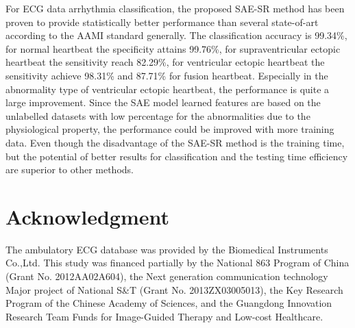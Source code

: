 \documentclass[journal]{IEEEtran}
\begin{document}
For ECG data arrhythmia classification, the proposed SAE-SR method has been proven to provide statistically better performance than several state-of-art according to the AAMI standard generally. The classification accuracy is 99.34\%, for normal heartbeat the specificity attains 99.76\%, for supraventricular ectopic heartbeat the sensitivity reach 82.29\%, for ventricular ectopic heartbeat the sensitivity achieve 98.31\% and 87.71\% for fusion heartbeat. Especially in the abnormality type of ventricular ectopic heartbeat, the performance is quite a large improvement. Since the SAE model learned features are based on the unlabelled datasets with low percentage for the abnormalities due to the physiological property, the performance could be improved with more training data. Even though the disadvantage of the SAE-SR method is the training time, but the potential of better results for classification and the testing time efficiency are superior to other methods. 


\section*{Acknowledgment}
The ambulatory ECG database was provided by the Biomedical Instruments Co.,Ltd.
This study was financed partially by the National 863 Program of China (Grant No. 2012AA02A604), the Next generation communication technology Major project of National S\&T (Grant No. 2013ZX03005013), the Key Research Program of the Chinese Academy of Sciences, and the Guangdong Innovation Research Team Funds for Image-Guided Therapy and Low-cost Healthcare. 
\ifCLASSOPTIONcaptionsoff
  \newpage
\fi



%
%
%
  
\end{document}
